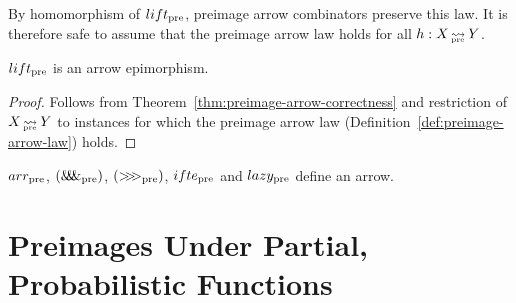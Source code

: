 By homomorphism of $lift_\mathrm{pre}$, preimage arrow combinators preserve this law.
It is therefore safe to assume that the preimage arrow law holds for all $h : X \operatorname{\rightsquigarrow_{\mspace{-22mu}_\mathrm{pre}}} Y$.

\begin{theorem}
$lift_\mathrm{pre}$ is an arrow epimorphism.
\end{theorem}
\begin{proof}
Follows from Theorem~\ref{thm:preimage-arrow-correctness} and restriction of $X \operatorname{\rightsquigarrow_{\mspace{-22mu}_\mathrm{pre}}} Y$ to instances for which the preimage arrow law (Definition~\ref{def:preimage-arrow-law}) holds.
\end{proof}

\begin{corollary}
$arr_\mathrm{pre}$, $(\mathit{\&\mspace{-7.5mu}\&\mspace{-7.5mu}\&}_\mathrm{pre})$, $({>}\mspace{-6mu}{>}\mspace{-6mu}{>}_\mathrm{pre})$, $ifte_\mathrm{pre}$ and $lazy_\mathrm{pre}$ define an arrow.
\end{corollary}


\section{Preimages Under Partial, Probabilistic Functions}

